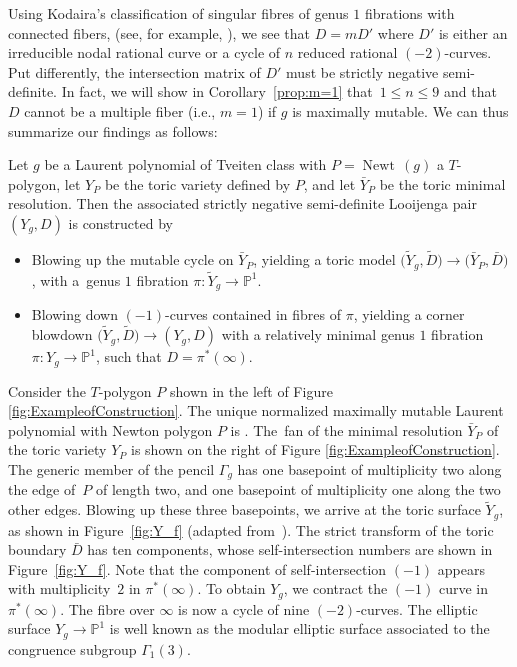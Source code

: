 \documentclass[pdftex]{sigma}
\numberwithin{equation}{section}
\DeclareMathOperator{\Newt}{{Newt \,}}
\newcommand{\PP}{\mathbb{P}}
\begin{document}
Using Kodaira's classification of singular fibres of genus $1$ fibrations with connected fibers, (see, for example, \cite[Section~{\rm V}.7]{BarthPetersVandeVen}), we see that $D=mD'$ where $D'$ is either an irreducible nodal rational curve or a cycle of $n$ reduced rational $(-2)$-curves. Put differently, the intersection matrix of $D'$ must be strictly negative semi-definite.
In fact, we will show in Corollary~\ref{prop:m=1} that~${1 \leq n \leq 9}$ and that $D$ cannot be a multiple fiber (i.e., $m=1$) if $g$ is maximally mutable. We can thus summarize our findings as follows:
	\begin{Definition}\label{def:mainconstruction}
	Let $g$ be a Laurent polynomial of Tveiten class with $P=\Newt(g)$ a $T$-polygon, let $Y_P$ be the toric variety defined by $P$, and let $\bar{Y}_P$ be the toric minimal resolution. Then the associated strictly negative semi-definite Looijenga pair $(Y_g, D)$ is constructed by
	\begin{itemize}\itemsep=0pt
		\item Blowing up the mutable cycle on $\bar{Y}_P$, yielding a toric model $\bigl(\tilde{Y}_g, \tilde{D}\bigr) \rightarrow \bigl(\bar{Y}_P, \bar{D}\bigr)$, with a~genus $1$ fibration $\pi \colon \tilde{Y}_g \rightarrow \PP^1$.
		\item Blowing down $(-1)$-curves contained in fibres of $\pi$, yielding a corner blowdown $\bigl(\tilde{Y}_g, \tilde{D}\bigr) \rightarrow (Y_g, D)$ with a relatively minimal genus $1$ fibration $\pi \colon {Y}_g \rightarrow \PP^1$, such that $D=\pi^*(\infty)$.
	\end{itemize}
\end{Definition}
\begin{Example}
	Consider the $T$-polygon $P$ shown in the left of Figure \ref{fig:ExampleofConstruction}. The unique normalized maximally mutable Laurent polynomial with Newton polygon $P$ is .
	The~fan of the minimal resolution $\bar{Y}_P$ of the toric variety $Y_P$ is shown on the right of Figure \ref{fig:ExampleofConstruction}. The generic member of the pencil $\Gamma_g$ has one basepoint of multiplicity two along the edge of~$P$ of length two, and one basepoint of multiplicity one along the two other edges. Blowing up these three basepoints, we arrive at the toric surface $\tilde{Y}_g$, as shown in Figure~\ref{fig:Y_f} (adapted from~\cite{ducat}). The strict transform of the toric boundary $\bar{D}$ has ten components, whose self-intersection numbers are shown in Figure~\ref{fig:Y_f}. Note that the component of self-intersection $(-1)$ appears with multiplicity~$2$ in $\pi^*(\infty)$.
	To obtain $Y_g$, we contract the $(-1)$ curve in $\pi^*(\infty)$. The fibre over $\infty$ is now a cycle of nine $(-2)$-curves. The elliptic surface $Y_g \rightarrow \PP^1$ is well known as the modular elliptic surface associated to the congruence subgroup $\Gamma_1(3)$.
\end{Example}
\end{document}
